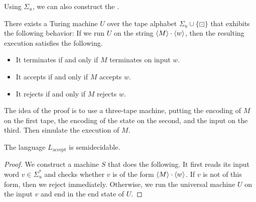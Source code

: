 
Using $\Sigma_u$, we can also construct the .

\begin{theorem}
  There exists a Turing machine $U$ over the tape alphabet $\Sigma_u \cup
  \{\boxdot\}$ that exhibits the following behavior:
  If we run $U$ on the string $\left< M \right> \cdot \left< w \right>$, then the resulting
  execution satisfies the following.
  \begin{itemize}
  \item It terminates if and only if $M$ terminates on input $w$.
  \item It accepts if and only if $M$ accepts $w$.
  \item It rejects if and only if $M$ rejects $w$.
  \end{itemize}
\end{theorem}

The idea of the proof is to use a three-tape machine, putting the encoding of
$M$ on the first tape, the encoding of the state on the second, and the input on
the third.
Then simulate the execution of $M$.

\begin{theorem}
  The language $L_{\text{accept}}$ is semidecidable.
\end{theorem}

\begin{proof}
  We construct a machine $S$ that does the following.
  It first reads its input word $v \in \Sigma_u^*$ and checks whether $v$ is of
  the form $\left< M \right> \cdot \left< w \right>$.
  If $v$ is not of this form, then we reject immediately.
  Otherwise, we run the universal machine $U$ on the input $v$ and end in the
  end state of $U$.
\end{proof}

